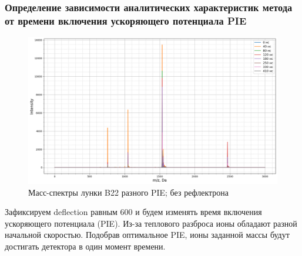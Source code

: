 \documentclass{article}
\begin{document}
\subsubsection{Определение зависимости аналитических характеристик метода от времени включения ускоряющего потенциала PIE}
\begin{figure}[h!]
\centering
    \includegraphics[width=0.7\linewidth]{Images/PIE.png}
    \caption{Масс-спектры лунки B22 разного PIE; без рефлектрона}
    \label{Общее}
\end{figure}
\par Зафиксируем deflection равным 600 и будем изменять время включения ускоряющего потенциала (PIE). Из-за теплового разброса ионы обладают разной начальной скоростью. Подобрав оптимальное PIE, ионы заданной массы будут достигать детектора в один момент времени.
\end{document}
